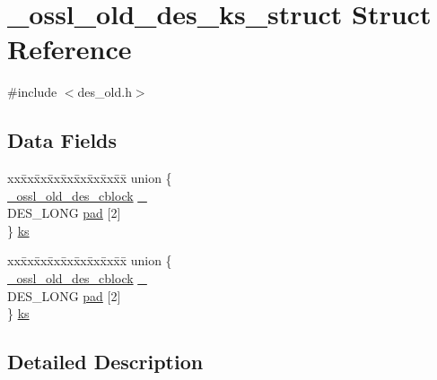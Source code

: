\hypertarget{struct__ossl__old__des__ks__struct}{}\section{\+\_\+ossl\+\_\+old\+\_\+des\+\_\+ks\+\_\+struct Struct Reference}
\label{struct__ossl__old__des__ks__struct}


{\ttfamily \#include $<$des\+\_\+old.\+h$>$}

\subsection*{Data Fields}
\begin{DoxyCompactItemize}
\item 
\begin{tabbing}
xx\=xx\=xx\=xx\=xx\=xx\=xx\=xx\=xx\=\kill
union \{\\
\>\hyperlink{include_2openssl_2des__old_8h_a72cd6536eab382ed06fcdd8df7ef5487}{\_ossl\_old\_des\_cblock} \hyperlink{struct__ossl__old__des__ks__struct_ab1f6fe1ab613e0fc503a8d4ab3eecebc}{\_}\\
\>DES\_LONG \hyperlink{struct__ossl__old__des__ks__struct_a7b3e46d7ccb5965b435d8534a1c088e3}{pad} \mbox{[}2\mbox{]}\\
\} \hyperlink{struct__ossl__old__des__ks__struct_a6a6be3622c76c4433cd8cf9fcecc8512}{ks}\\

\end{tabbing}\item 
\begin{tabbing}
xx\=xx\=xx\=xx\=xx\=xx\=xx\=xx\=xx\=\kill
union \{\\
\>\hyperlink{include_2openssl_2des__old_8h_a72cd6536eab382ed06fcdd8df7ef5487}{\_ossl\_old\_des\_cblock} \hyperlink{struct__ossl__old__des__ks__struct_ab1f6fe1ab613e0fc503a8d4ab3eecebc}{\_}\\
\>DES\_LONG \hyperlink{struct__ossl__old__des__ks__struct_a7b3e46d7ccb5965b435d8534a1c088e3}{pad} \mbox{[}2\mbox{]}\\
\} \hyperlink{struct__ossl__old__des__ks__struct_a1eb11730d530220c7dbeefefbbc0dd9c}{ks}\\

\end{tabbing}\end{DoxyCompactItemize}


\subsection{Detailed Description}


